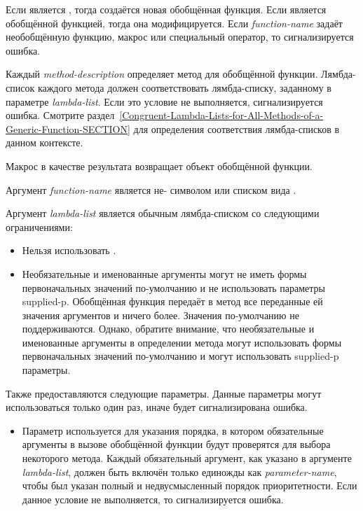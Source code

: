 \begin{defmac}
Если  является , тогда создаётся новая
обобщённая функция. Если  является
обобщённой функцией, тогда она модифицируется. Если \emph{function-name} задаёт
необобщённую функцию, макрос или специальный оператор, то сигнализируется ошибка.

Каждый \emph{method-description} определяет метод для обобщённой функции.
Лямбда-список каждого метода должен соответствовать лямбда-списку, заданному в
параметре \emph{lambda-list}. Если это условие не выполняется, сигнализируется
ошибка.
Смотрите
раздел~\ref{Congruent-Lambda-Lists-for-All-Methods-of-a-Generic-Function-SECTION}
для определения соответствия лямбда-списков в данном контексте.

Макрос  в качестве результата возвращает объект обобщённой
функции.

Аргумент \emph{function-name} является не- символом или списком вида
.

Аргумент \emph{lambda-list} является обычным лямбда-списком со следующими
ограничениями:

\begin{itemize}

\item 
Нельзя использовать .

\item 
Необязательные и именованные аргументы могут не иметь формы первоначальных значений
по-умолчанию и не использовать параметры supplied-p.
Обобщённая функция передаёт в метод все переданные ей значения аргументов и
ничего более. Значения по-умолчанию не поддерживаются.
Однако, обратите внимание, что необязательные и именованные аргументы в
определении метода могут использовать формы первоначальных значений по-умолчанию
и могут использовать supplied-p параметры.
\end{itemize}

Также предоставляются следующие параметры. Данные параметры могут использоваться
только один раз, иначе будет сигнализирована ошибка.
\begin{itemize}

\item 
Параметр  используется для указания порядка, в
котором обязательные аргументы в вызове обобщённой функции будут проверятся для
выбора некоторого метода. Каждый обязательный аргумент, как указано в аргументе
\emph{lambda-list}, должен быть включён только единожды как
\emph{parameter-name}, чтобы был указан полный и недвусмысленный порядок
приоритетности. Если данное условие не выполняется, то сигнализируется ошибка.


\end{itemize}
\end{defmac}
